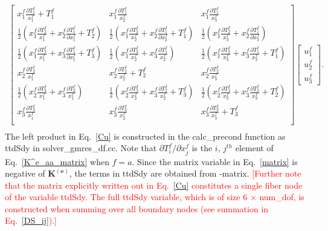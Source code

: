 \documentclass[12pt,aps,pre]{revtex4}
\newcommand{\red}[1]{\textcolor{red}{[#1]}}
\begin{document}
\begin{eqnarray}
%
\begin{bmatrix}
x_1^f \frac{\partial T_1^f}{x_1^f} + T_1^f & x_1^f \frac{\partial T_1^f}{x_2^f} & x_1^f \frac{\partial T_1^f}{x_3^f} \\
%
\frac{1}{2} \left( x_1^f \frac{\partial T_2^f}{x_1^f} + x_2^f \frac{\partial T_1^f}{\partial x_1^f} + T_2^f \right) & \frac{1}{2} \left( x_1^f \frac{\partial T_2^f}{x_2^f} + x_2^f \frac{\partial T_1^f}{\partial x_2^f} + T_1^f \right) & \frac{1}{2} \left( x_1^f \frac{\partial T_2^f}{x_3^f} + x_2^f \frac{\partial T_1^f}{\partial x_3^f} \right) \\
%
\frac{1}{2} \left( x_1^f \frac{\partial T_3^f}{x_1^f} + x_3^f \frac{\partial T_1^f}{\partial x_1^f}  +T_3^f \right) & \frac{1}{2} \left(x_1^f \frac{\partial T_3^f}{x_2^f} + x_3^f \frac{\partial T_1^f}{x_2^f} \right) & \frac{1}{2} \left( x_1^f \frac{\partial T_3^f}{x_3^f} + x_3^f \frac{\partial T_1^f}{x_3^f} + T_1^f \right)\\
%
x_2^f \frac{\partial T_2^f}{x_1^f} & x_2^f \frac{\partial T_2^f}{x_2^f} + T_2^f & x_2^f \frac{\partial T_2^f}{x_3^f} \\
%
\frac{1}{2} \left( x_2^f \frac{\partial T_3^f}{x_1^f} + x_3^f \frac{\partial T_2^f}{x_1^f} \right)& \frac{1}{2} \left( x_2^f \frac{\partial T_3^f}{x_2^f} + x_3^f \frac{\partial T_2^f}{x_2^f} + T_3^f \right) & \frac{1}{2} \left(x_2^f \frac{\partial T_3^f}{x_3^f} + x_3^f \frac{\partial T_2^f}{x_3^f} + T_2^f \right)\\
%
x_3^f \frac{\partial T_3^f}{x_1^f} & x_3^f \frac{\partial T_3^f}{x_2^f} & x_3^f \frac{\partial T_3^f}{x_3^f} + T_3^f \\
\end{bmatrix}
%
\begin{bmatrix}
u_1^f \\ u_2^f \\ u_3^f 
\end{bmatrix}. \nonumber\\ 
%
\label{Cu}
\end{eqnarray}
%
The left product in Eq.\ \eqref{Cu} is constructed in the calc\_precond function as ttdSdy in solver\_gmres\_df.cc. Note that $\partial T_i^f/\partial x_j^f$ is the $i$, $j^{th}$ element of Eq.\ \eqref{K^e_aa_matrix} when $f=a$. Since the matrix variable in Eq.\ \eqref{matrix} is negative of $\textbf{K}^{(\textbf{e})}$, the terms in ttdSdy are obtained from -matrix. \red{Further note that the matrix explicitly written out in Eq.\ \eqref{Cu} constitutes a single fiber node of the variable ttdSdy. The full ttdSdy variable, which is of size 6 $\times$ num\_dof, is constructed when summing over all boundary nodes (see summation in Eq.\ \eqref{DS_ij}).} 
\end{document}
